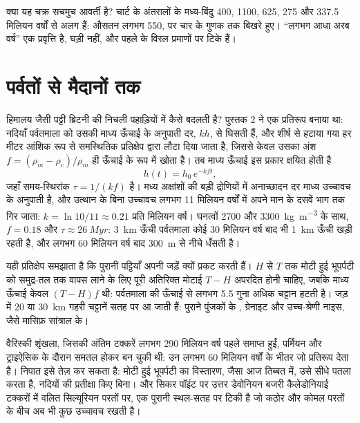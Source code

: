क्या यह चक्र सचमुच आवर्ती है? चार्ट के अंतरालों के मध्य-बिंदु 400,
1100, 625, 275 और 337.5 मिलियन वर्षों से अलग हैं: औसतन लगभग 550, पर चार के
गुणक तक बिखरे हुए। ``लगभग आधा अरब वर्ष'' एक प्रवृत्ति है, घड़ी नहीं, और पहले के
 विरल प्रमाणों पर टिके हैं।

\section{पर्वतों से मैदानों तक}\label{sec:b2:wilson-cycle:erosion}

हिमालय जैसी पट्टी ब्रिटनी की निचली पहाड़ियों में कैसे बदलती है? पुस्तक 2 ने
एक प्रतिरूप बनाया था: नदियाँ पर्वतमाला को उसकी माध्य ऊँचाई के अनुपाती दर, $kh$, से घिसती हैं,
और शीर्ष से हटाया गया हर मीटर आंशिक रूप से समस्थितिक प्रतिक्षेप द्वारा लौटा दिया जाता है, जिससे केवल
उसका अंश $f = (\rho_m - \rho_c)/\rho_m$ ही ऊँचाई के रूप में खोता है। तब माध्य ऊँचाई
इस प्रकार क्षयित होती है
\[
  h(t) = h_0\,e^{-k f t} ,
\]
जहाँ समय-स्थिरांक $\tau = 1/(kf)$ है। मध्य अक्षांशों की बड़ी द्रोणियों में अनाच्छादन दर
माध्य उच्चावच के अनुपाती है, और उत्थान के बिना उच्चावच लगभग 11 मिलियन वर्षों में अपने मान के दसवें भाग तक गिर
जाता: $k = \ln 10/11 \approx 0.21$ प्रति मिलियन वर्ष। घनत्वों 2700 और
\qty{3300}{kg.m^{-3}} के साथ, $f = 0.18$ और $\tau \approx \qty{26}{Myr}$: \qty{3}{km}
ऊँची पर्वतमाला कोई 30 मिलियन वर्ष बाद भी \qty{1}{km} ऊँची खड़ी रहती है, और लगभग 60 मिलियन वर्ष बाद
\qty{300}{m} से नीचे धँसती है।

यही प्रतिक्षेप समझाता है कि पुरानी पट्टियाँ अपनी जड़ें क्यों प्रकट करती हैं। $H$ से
$T$ तक मोटी हुई भूपर्पटी को समुद्र-तल तक वापस लाने के लिए पूरी अतिरिक्त मोटाई $T - H$ अपरदित होनी चाहिए, जबकि माध्य
ऊँचाई केवल $(T - H)f$ थी: पर्वतमाला की ऊँचाई से लगभग 5.5 गुना अधिक चट्टान हटती है।
जड़ में 20 या \qty{30}{km} गहरी चट्टानें सतह पर आ जाती हैं: पुराने पुंजकों के
, ग्रेनाइट और उच्च-श्रेणी नाइस, जैसे मासिफ़
सांत्राल के।

वैरिस्की शृंखला, जिसकी अंतिम टक्करें लगभग 290 मिलियन वर्ष पहले समाप्त हुईं,
पर्मियन और ट्राइऐसिक के दौरान समतल होकर  बन चुकी थी: उन लगभग 60 मिलियन वर्षों के भीतर
जो प्रतिरूप देता है। निपात इसे तेज़ कर सकता है: मोटी हुई भूपर्पटी का विस्तारण, जैसा आज
तिब्बत में, उसे सीधे पतला करता है, नदियों की प्रतीक्षा किए बिना। और सिकर पॉइंट पर उत्तर डेवोनियन बजरी
कैलेडोनियाई टक्करों में वलित सिल्यूरियन परतों पर, एक पुरानी स्थल-सतह पर टिकी है जो कठोर और कोमल परतों के बीच
अब भी कुछ उच्चावच रखती है।

